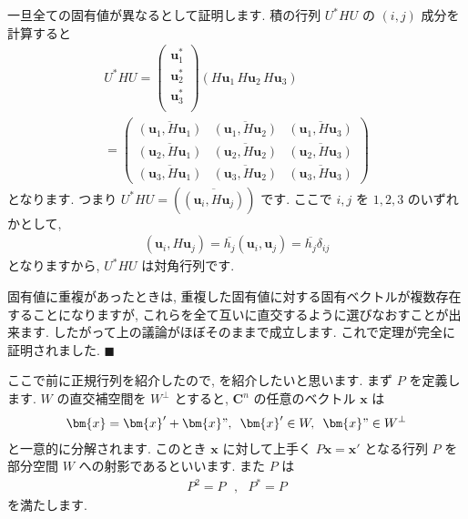 \documentclass[openany, a4paper, oneside]{book}
\theoremstyle{break}
\theoremstyle{breakdefn}
\newcommand{\bs}{\blacksquare}
\begin{document}
一旦全ての固有値が異なるとして証明します.
積の行列 $U^* HU$ の $(i,j)$ 成分を計算すると
    \begin{gather}
        U^* H U
        =
        \begin{pmatrix}
            \bm{u}_1^* \\
            \bm{u}_2^* \\
            \bm{u}_3^* \\
        \end{pmatrix}
        ( H \bm{u}_1 \, H \bm{u}_2 \, H \bm{u}_3 ) \\
        =
        \begin{pmatrix}
            \overline{ (\bm{u}_1 , H \bm{u}_1 ) } & \overline{ (\bm{u}_1 , H \bm{u}_2 ) } & \overline{ (\bm{u}_1 , H \bm{u}_3 ) } \\
            \overline{ (\bm{u}_2 , H \bm{u}_1 ) } & \overline{ (\bm{u}_2 , H \bm{u}_2 ) } & \overline{ (\bm{u}_2 , H \bm{u}_3 ) } \\
            \overline{ (\bm{u}_3 , H \bm{u}_1 ) } & \overline{ (\bm{u}_3 , H \bm{u}_2 ) } & \overline{ (\bm{u}_3 , H \bm{u}_3 ) }
        \end{pmatrix}
    \end{gather}
となります. つまり $U^* H U = \left ( \overline{ \left ( \bm{u}_i , H \bm{u}_j \right) } \right)$ です.
ここで $i,j$ を $1,2,3$ のいずれかとして,
    \begin{align}
        ( \bm{u}_i , H \bm{u}_j )
        =
        \overline{h_j} ( \bm{u}_i , \bm{u}_j )
        =
        \overline{h_j} \delta _{ij}
    \end{align}
となりますから,  $U^* H U$ は対角行列です.

固有値に重複があったときは, 重複した固有値に対する固有ベクトルが複数存在することになりますが,
これらを全て互いに直交するように選びなおすことが出来ます.
したがって上の議論がほぼそのままで成立します.
これで定理が完全に証明されました.  $\bs$

ここで前に正規行列を紹介したので, を紹介したいと思います.
まず $P$ を定義します.
$W$ の直交補空間を $W^{\perp }$ とすると,  $\bm{C}^n$ の任意のベクトル $\bm{x}$ は
    \begin{align}
        \bm{x} = \bm{x}' + \bm{x}" , \,\,\, \bm{x}' \in W, \,\,\, \bm{x}" \in W^{\perp}
    \end{align}
と一意的に分解されます. このとき $\bm{x}$ に対して上手く $P\bm{x}=\bm{x}'$
となる行列 $P$ を部分空間 $W$ への射影であるといいます. また $P$ は
    \begin{align}
        P^2 = P\,\,\,\,,\,\,\,\,P^{*}=P
    \end{align}
を満たします.
\end{document}
